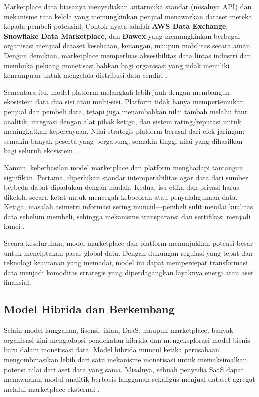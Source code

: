 Marketplace data biasanya menyediakan antarmuka standar (misalnya API) dan mekanisme tata kelola yang memungkinkan penjual menawarkan dataset mereka kepada pembeli potensial. Contoh nyata adalah \textbf{AWS Data Exchange}, \textbf{Snowflake Data Marketplace}, dan \textbf{Dawex} yang memungkinkan berbagai organisasi menjual dataset kesehatan, keuangan, maupun mobilitas secara aman. Dengan demikian, marketplace memperluas aksesibilitas data lintas industri dan membuka peluang monetisasi bahkan bagi organisasi yang tidak memiliki kemampuan untuk mengelola distribusi data sendiri \cite{mckinsey2021}.

Sementara itu, model platform melangkah lebih jauh dengan membangun ekosistem data dua sisi atau multi-sisi. Platform tidak hanya mempertemukan penjual dan pembeli data, tetapi juga menambahkan nilai tambah melalui fitur analitik, integrasi dengan alat pihak ketiga, dan sistem rating/reputasi untuk meningkatkan kepercayaan. Nilai strategis platform berasal dari efek jaringan: semakin banyak peserta yang bergabung, semakin tinggi nilai yang dihasilkan bagi seluruh ekosistem \cite{eisenmann2011platform}.

Namun, keberhasilan model marketplace dan platform menghadapi tantangan signifikan. Pertama, diperlukan standar interoperabilitas agar data dari sumber berbeda dapat dipadukan dengan mudah. Kedua, isu etika dan privasi harus dikelola secara ketat untuk mencegah kebocoran atau penyalahgunaan data. Ketiga, masalah asimetri informasi sering muncul—pembeli sulit menilai kualitas data sebelum membeli, sehingga mekanisme transparansi dan sertifikasi menjadi kunci \cite{labreuche2020}. 

Secara keseluruhan, model marketplace dan platform menunjukkan potensi besar untuk menciptakan pasar global data. Dengan dukungan regulasi yang tepat dan teknologi keamanan yang memadai, model ini dapat mempercepat transformasi data menjadi komoditas strategis yang diperdagangkan layaknya energi atau aset finansial.


\subsection{Model Hibrida dan Berkembang}

Selain model langganan, lisensi, iklan, DaaS, maupun marketplace, banyak organisasi kini mengadopsi pendekatan hibrida dan mengeksplorasi model bisnis baru dalam monetisasi data. Model hibrida muncul ketika perusahaan mengombinasikan lebih dari satu mekanisme monetisasi untuk memaksimalkan potensi nilai dari aset data yang sama. Misalnya, sebuah penyedia SaaS dapat menawarkan modul analitik berbasis langganan sekaligus menjual dataset agregat melalui marketplace eksternal \cite{ott2019business}. 

